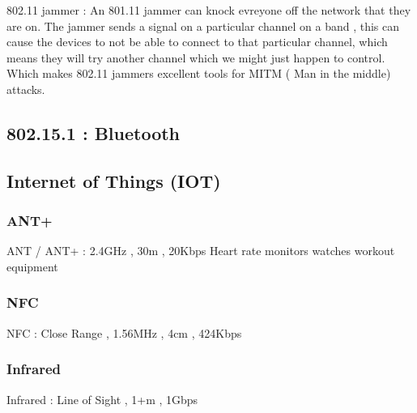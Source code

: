 802.11 jammer : An 801.11 jammer can knock evreyone off the network that they
are on. The jammer sends a signal on a particular channel on a band , this can
cause the devices to not be able to connect to that particular channel, which
means they will try another channel which we might just happen to control. Which
makes 802.11 jammers excellent tools for MITM ( Man in the middle) attacks.


\subsubsectionend

\subsectionend

\subsection{802.15.1 : Bluetooth}
\label{ssec:802_15_1_bluetooth}


\subsectionend

\subsection{Internet of Things (IOT)}
\label{ssec:internet_of_things_iot_}

\subsubsection{ANT+}
\label{sssec:ant_}

ANT / ANT+ : 2.4GHz , 30m , 20Kbps
Heart rate monitors
watches
workout equipment


\subsubsectionend

\subsubsection{NFC}
\label{sssec:nfc}
NFC : Close Range , 1.56MHz , 4cm , 424Kbps


\subsubsectionend

\subsubsection{Infrared}
\label{sssec:infrared}

Infrared : Line of Sight , 1+m , 1Gbps

